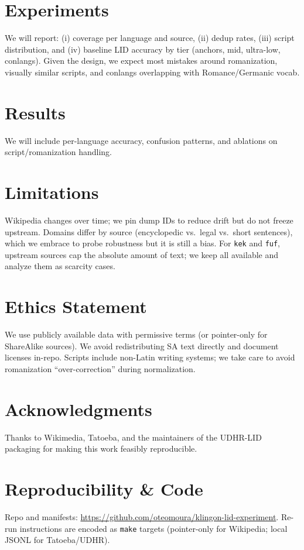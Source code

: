 \documentclass[11pt]{article}
\begin{document}


\section{Experiments}
We will report: 
(i) coverage per language and source,
(ii) dedup rates,
(iii) script distribution, and
(iv) baseline LID accuracy by tier (anchors, mid, ultra-low, conlangs).
Given the design, we expect most mistakes around romanization, visually similar scripts, and conlangs overlapping with Romance/Germanic vocab.

\section{Results}
We will include per-language accuracy, confusion patterns, and ablations on script/romanization handling.

\section*{Limitations}
Wikipedia changes over time; we pin dump IDs to reduce drift but do not freeze upstream. Domains differ by source (encyclopedic vs.\ legal vs.\ short sentences), which we embrace to probe robustness but it is still a bias. For \texttt{kek} and \texttt{fuf}, upstream sources cap the absolute amount of text; we keep all available and analyze them as scarcity cases.

\section*{Ethics Statement}
We use publicly available data with permissive terms (or pointer-only for ShareAlike sources). We avoid redistributing SA text directly and document licenses in-repo. Scripts include non-Latin writing systems; we take care to avoid romanization “over-correction” during normalization.

\section*{Acknowledgments}
Thanks to Wikimedia, Tatoeba, and the maintainers of the UDHR-LID packaging for making this work feasibly reproducible.

\nocite{wikimedia_wikipedia_hf,tatoeba_project,cis_lmu_udhr_lid,unicode_udhr_xml}


\appendix
\section{Reproducibility \& Code}
\label{sec:repro}
Repo and manifests: \url{https://github.com/oteomoura/klingon-lid-experiment}.
Re-run instructions are encoded as \texttt{make} targets (pointer-only for Wikipedia; local JSONL for Tatoeba/UDHR).
\end{document}
